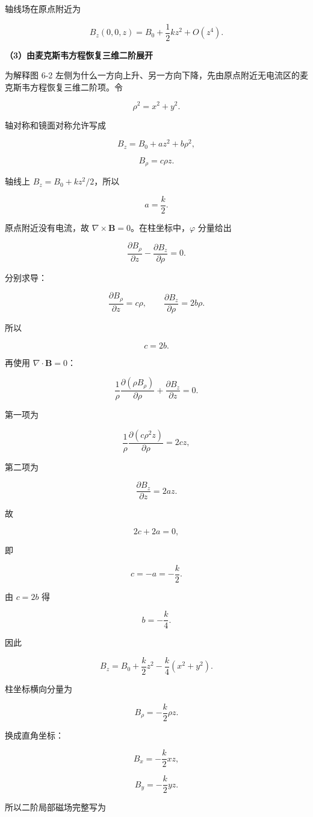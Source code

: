 \documentclass[12pt,a4paper,UTF8]{ctexart}
\begin{document}
轴线场在原点附近为

\[
B_z(0,0,z)=B_0+\frac12kz^2+O(z^4).
\]

\textbf{（3）由麦克斯韦方程恢复三维二阶展开}

为解释图 6-2
左侧为什么一方向上升、另一方向下降，先由原点附近无电流区的麦克斯韦方程恢复三维二阶项。令

\[\rho^2=x^2+y^2.\]

轴对称和镜面对称允许写成

\[
B_z=B_0+az^2+b\rho^2,
\]

\[
B_\rho=c\rho z.
\]

轴线上 \(B_z=B_0+kz^2/2\)，所以

\[a=\frac k2.\]

原点附近没有电流，故 \(\nabla\times\bm B=0\)。在柱坐标中，\(\varphi\)
分量给出

\[
\frac{\partial B_\rho}{\partial z}
-\frac{\partial B_z}{\partial\rho}=0.
\]

分别求导：

\[
\frac{\partial B_\rho}{\partial z}=c\rho,
\qquad
\frac{\partial B_z}{\partial\rho}=2b\rho.
\]

所以

\[c=2b.\]

再使用 \(\nabla\cdot\bm B=0\)：

\[
\frac1\rho\frac{\partial(\rho B_\rho)}{\partial\rho}
+\frac{\partial B_z}{\partial z}=0.
\]

第一项为

\[
\frac1\rho\frac{\partial(c\rho^2z)}{\partial\rho}
=2cz,
\]

第二项为

\[\frac{\partial B_z}{\partial z}=2az.\]

故

\[2c+2a=0,\]

即

\[c=-a=-\frac k2.\]

由 \(c=2b\) 得

\[b=-\frac k4.\]

因此

\[
\boxed{
B_z=B_0+\frac k2z^2-
\frac k4(x^2+y^2)
}.
\]

柱坐标横向分量为

\[
B_\rho=-\frac k2\rho z.
\]

换成直角坐标：

\[
\boxed{B_x=-\frac k2xz},
\]

\[
\boxed{B_y=-\frac k2yz}.
\]

所以二阶局部磁场完整写为
\end{document}

